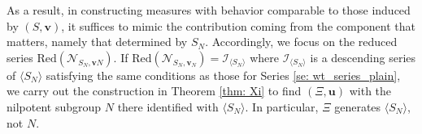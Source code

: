 \documentclass[pdflatex,sn-mathphys-num]{sn-jnl}%
\theoremstyle{thmstyleone}%
\theoremstyle{thmstyletwo}%
\theoremstyle{thmstylethree}%
\newtheorem{lem}{Lemma}%
\newtheorem{comment}{Comment}
\begin{document}

As a result, in constructing measures with behavior comparable to those induced by $(S,\mathbf{v})$, it suffices to mimic the contribution coming from the component that matters, namely that determined by $S_N$. Accordingly, we focus on the reduced series $\mathrm{Red}(\mathcal{N}_{S_N,\mathbf{v}N})$. If $\mathrm{Red}(\mathcal{N}_{S_N,\mathbf{v}_N}) = \mathcal{I}_{\langle S_N\rangle}$ where $\mathcal{I}_{\langle S_N\rangle}$ is a descending series of $\langle S_N\rangle$ satisfying  the same conditions as those for Series \ref{se: wt_series_plain}, we carry out the construction in  Theorem \ref{thm: Xi} to find $(\Xi, \mathbf{u})$ with the nilpotent subgroup $N$ there identified with $\langle S_N\rangle$. In particular, $\Xi$ generates $\langle S_N\rangle$, not $N$. 
\end{document}

